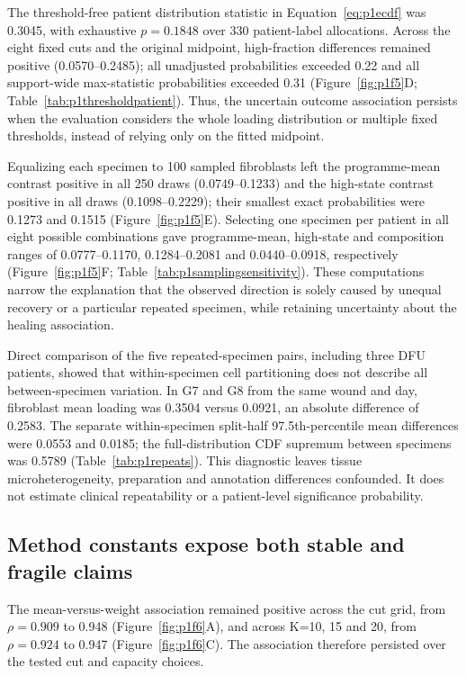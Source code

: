 \documentclass[10pt,a4paper]{article}
\begin{document}
The threshold-free patient distribution statistic in Equation~\eqref{eq:p1ecdf} was 0.3045, with exhaustive $p=0.1848$ over 330 patient-label allocations. Across the eight fixed cuts and the original midpoint, high-fraction differences remained positive (0.0570--0.2485); all unadjusted probabilities exceeded 0.22 and all support-wide max-statistic probabilities exceeded 0.31 (Figure~\ref{fig:p1f5}D; Table~\ref{tab:p1thresholdpatient}). Thus, the uncertain outcome association persists when the evaluation considers the whole loading distribution or multiple fixed thresholds, instead of relying only on the fitted midpoint.

Equalizing each specimen to 100 sampled fibroblasts left the programme-mean contrast positive in all 250 draws (0.0749--0.1233) and the high-state contrast positive in all draws (0.1098--0.2229); their smallest exact probabilities were 0.1273 and 0.1515 (Figure~\ref{fig:p1f5}E). Selecting one specimen per patient in all eight possible combinations gave programme-mean, high-state and composition ranges of 0.0777--0.1170, 0.1284--0.2081 and 0.0440--0.0918, respectively (Figure~\ref{fig:p1f5}F; Table~\ref{tab:p1samplingsensitivity}). These computations narrow the explanation that the observed direction is solely caused by unequal recovery or a particular repeated specimen, while retaining uncertainty about the healing association.


Direct comparison of the five repeated-specimen pairs, including three DFU patients, showed that within-specimen cell partitioning does not describe all between-specimen variation. In G7 and G8 from the same wound and day, fibroblast mean loading was 0.3504 versus 0.0921, an absolute difference of 0.2583. The separate within-specimen split-half 97.5th-percentile mean differences were 0.0553 and 0.0185; the full-distribution CDF supremum between specimens was 0.5789 (Table~\ref{tab:p1repeats}). This diagnostic leaves tissue microheterogeneity, preparation and annotation differences confounded. It does not estimate clinical repeatability or a patient-level significance probability.

\subsection{Method constants expose both stable and fragile claims}



The mean-versus-weight association remained positive across the cut grid, from $\rho=0.909$ to 0.948 (Figure~\ref{fig:p1f6}A\label{call:p1f6}), and across K=10, 15 and 20, from $\rho=0.924$ to 0.947 (Figure~\ref{fig:p1f6}C). The association therefore persisted over the tested cut and capacity choices.
\end{document}
